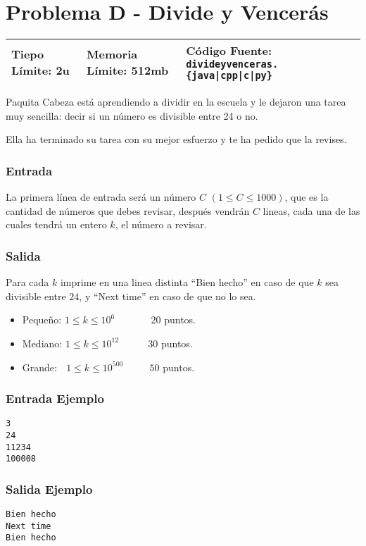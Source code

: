 \chapter*{Problema D - Divide y Vencerás}

\begin{center}
  \begin{tabular}{ | l | l | l | }
    \hline
    Tiepo Límite: 2u & Memoria Límite: 512mb & Código Fuente: \texttt{divideyvenceras.\{java|cpp|c|py\}} \\
    \hline
  \end{tabular}
\end{center}


Paquita Cabeza está aprendiendo a dividir en la escuela y le dejaron una tarea muy sencilla: decir si un número es divisible entre 24 o no.

Ella ha terminado su tarea con su mejor esfuerzo y te ha pedido que la revises.

\subsection*{Entrada}

La primera línea de entrada será un número $C$ $(1 \leq  C\leq 1000)$, que es la cantidad de números que debes revisar, después vendrán $C$ lineas, cada una de las cuales tendrá un entero $k$, el número a revisar.

\subsection*{Salida}
Para cada $k$ imprime en una linea distinta ``Bien hecho'' en caso de que $k$ sea divisible entre $24$, y ``Next time'' en caso de que no lo sea.

\begin{itemize}
\item Pequeño: $ 1\leq k \leq 10^6 $ $\quad \quad \quad$ $20$ puntos.
\item Mediano: $ 1\leq k \leq 10^{12} $ $\quad \quad \;$ $30$ puntos.
\item Grande: $\,\;\, 1\leq k \leq 10^{500} $  $\quad \quad$ $50$ puntos.

\end{itemize}

\begin{multicols}{2}
\subsection*{Entrada Ejemplo}
\begin{verbatim}
3
24
11234
100008
\end{verbatim}
\columnbreak
\subsection*{Salida Ejemplo}
\begin{verbatim}
Bien hecho
Next time
Bien hecho
\end{verbatim}
\end{multicols}
